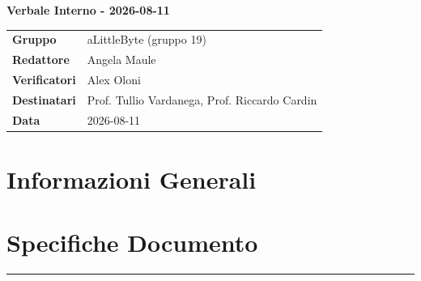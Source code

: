 \documentclass[a4paper,12pt]{article}
\begin{document}
\thispagestyle{firstpage}

\vspace*{0.5cm}

\begin{center}
    {\LARGE \textbf{Verbale Interno - 2026-08-11}}
\end{center}

\vspace{1.5cm}

\begin{center}
    \renewcommand{\arraystretch}{1.3}
    \begin{tcolorbox}[
        width=0.92\textwidth,
        colback=gray!6,
        colframe=gray!45,
        boxrule=0.5pt,
        arc=2mm,
        boxsep=0pt,
        left=8pt, right=8pt, top=8pt, bottom=8pt
    ]
        \begin{tabularx}{\linewidth}{>{\bfseries}p{3.5cm} X}
            Gruppo      & aLittleByte (gruppo 19) \\
            Redattore   & Angela Maule \\
            Verificatori & Alex Oloni\\
            Destinatari & Prof. Tullio Vardanega, Prof. Riccardo Cardin \\
            Data        & 2026-08-11\\
        \end{tabularx}
    \end{tcolorbox}
\end{center}

\newpage

\tableofcontents
\newpage
\section{Informazioni Generali}
\section*{Specifiche Documento}
\hrule
\vspace{1cm}
\end{document}
